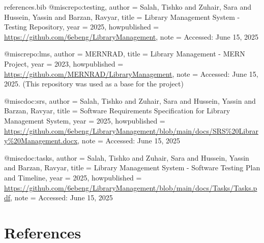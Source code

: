 
\begin{filecontents*}[overwrite]{references.bib}
@misc{repo:testing,
  author       = {Salah, Tishko and Zuhair, Sara and Hussein, Yassin and Barzan, Ravyar},
  title        = {Library Management System - Testing Repository},
  year         = {2025},
  howpublished = {\url{https://github.com/6ebeng/LibraryManagement}},
  note         = {Accessed: June 15, 2025}
}

@misc{repo:lms,
  author       = {{MERNRAD}},
  title        = {Library Management - MERN Project},
  year         = {2023},
  howpublished = {\url{https://github.com/MERNRAD/LibraryManagement}},
  note         = {Accessed: June 15, 2025. (This repository was used as a base for the project)}
}

@misc{doc:srs,
  author       = {Salah, Tishko and Zuhair, Sara and Hussein, Yassin and Barzan, Ravyar},
  title        = {Software Requirements Specification for Library Management System},
  year         = {2025},
  howpublished = {\url{https://github.com/6ebeng/LibraryManagement/blob/main/docs/SRS\%20Library\%20Management.docx}},
  note         = {Accessed: June 15, 2025}
}

@misc{doc:tasks,
  author       = {Salah, Tishko and Zuhair, Sara and Hussein, Yassin and Barzan, Ravyar},
  title        = {Library Management System - Software Testing Plan and Timeline},
  year         = {2025},
  howpublished = {\url{https://github.com/6ebeng/LibraryManagement/blob/main/docs/Tasks/Tasks.pdf}},
  note         = {Accessed: June 15, 2025}
}
\end{filecontents*}


\chapter*{References}
\label{chap:references}

\nocite{*}

\printbibliography[heading=none]
